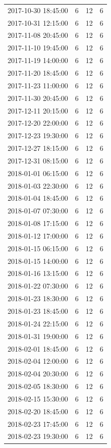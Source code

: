 \begin{tabular}{lrrr}
2017-10-30 18:45:00 & 6 & 12 & 6 \\
2017-10-31 12:15:00 & 6 & 12 & 6 \\
2017-11-08 20:45:00 & 6 & 12 & 6 \\
2017-11-10 19:45:00 & 6 & 12 & 6 \\
2017-11-19 14:00:00 & 6 & 12 & 6 \\
2017-11-20 18:45:00 & 6 & 12 & 6 \\
2017-11-23 11:00:00 & 6 & 12 & 6 \\
2017-11-30 20:45:00 & 6 & 12 & 6 \\
2017-12-11 20:15:00 & 6 & 12 & 6 \\
2017-12-20 22:00:00 & 6 & 12 & 6 \\
2017-12-23 19:30:00 & 6 & 12 & 6 \\
2017-12-27 18:15:00 & 6 & 12 & 6 \\
2017-12-31 08:15:00 & 6 & 12 & 6 \\
2018-01-01 06:15:00 & 6 & 12 & 6 \\
2018-01-03 22:30:00 & 6 & 12 & 6 \\
2018-01-04 18:45:00 & 6 & 12 & 6 \\
2018-01-07 07:30:00 & 6 & 12 & 6 \\
2018-01-08 17:15:00 & 6 & 12 & 6 \\
2018-01-12 17:00:00 & 6 & 12 & 6 \\
2018-01-15 06:15:00 & 6 & 12 & 6 \\
2018-01-15 14:00:00 & 6 & 12 & 6 \\
2018-01-16 13:15:00 & 6 & 12 & 6 \\
2018-01-22 07:30:00 & 6 & 12 & 6 \\
2018-01-23 18:30:00 & 6 & 12 & 6 \\
2018-01-23 18:45:00 & 6 & 12 & 6 \\
2018-01-24 22:15:00 & 6 & 12 & 6 \\
2018-01-31 19:00:00 & 6 & 12 & 6 \\
2018-02-01 18:45:00 & 6 & 12 & 6 \\
2018-02-04 12:00:00 & 6 & 12 & 6 \\
2018-02-04 20:30:00 & 6 & 12 & 6 \\
2018-02-05 18:30:00 & 6 & 12 & 6 \\
2018-02-15 15:30:00 & 6 & 12 & 6 \\
2018-02-20 18:45:00 & 6 & 12 & 6 \\
2018-02-23 17:45:00 & 6 & 12 & 6 \\
2018-02-23 19:30:00 & 6 & 12 & 6 \\

\end{tabular}
